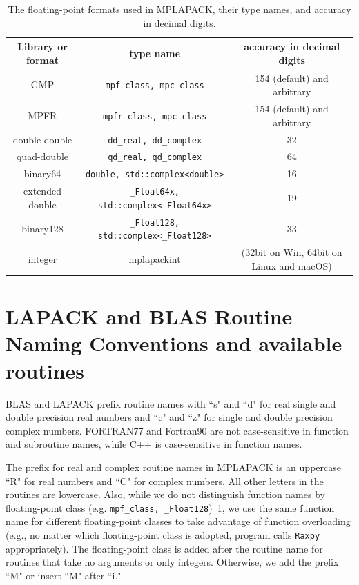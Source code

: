 \documentclass[12pt]{article}
\begin{document}
\begin{table}
\caption{The floating-point formats used in MPLAPACK, their type names, and accuracy in decimal digits.}\label{mplapackformats}
\begin{center}
\begin{tabular}{c|c|c} \hline
Library or format & type name & accuracy in decimal digits \\ \hline
GMP             & {\tt mpf\_class, mpc\_class}       & 154 (default) and arbitrary\\
MPFR            & {\tt mpfr_class, mpc_class}            & 154 (default) and arbitrary \\
double-double   & {\tt dd\_real, dd\_complex}        & 32\\
quad-double     & {\tt qd\_real, qd\_complex}        & 64 \\
binary64        & {\tt double, std::complex<double>} & 16 \\
extended double & {\tt \_Float64x, std::complex<\_Float64x>} & 19  \\
binary128       & {\tt \_Float128, std::complex<\_Float128>} & 33 \\
integer         & mplapackint & (32bit on Win, 64bit on Linux and macOS) \\ \hline
\end{tabular}
\end{center}
\end{table}


\section{LAPACK and BLAS Routine Naming Conventions and available routines}
\label{sec:nameconventions}
BLAS and LAPACK prefix routine names with ``s" and ``d" for real single and double precision real numbers and ``c" and ``z" for single and double precision complex numbers. FORTRAN77 and Fortran90 are not case-sensitive in function and subroutine names, while C++ is case-sensitive in function names.

The prefix for real and complex routine names in MPLAPACK is an uppercase ``R" for real numbers and ``C" for complex numbers. All other letters in the routines are lowercase.
Also, while we do not distinguish function names by floating-point class (e.g. {\tt mpf\_class, \_Float128})~\ref{mplapackformats}, we use the same function name for different floating-point classes to take advantage of function overloading (e.g., no matter which floating-point class is adopted, program calls {\tt Raxpy} appropriately). The floating-point class is added after the routine name for routines that take no arguments or only integers. Otherwise, we add the prefix ``M" or insert ``M" after ``i."
\end{document}
